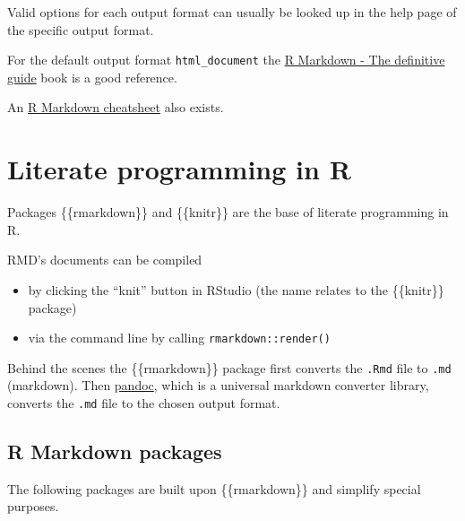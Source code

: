 \documentclass[]{book}
\begin{document}
Valid options for each output format can usually be looked up in the help page of the specific output format.

For the default output format \texttt{html\_document} the \href{https://bookdown.org/yihui/rmarkdown/html-document.html}{R Markdown - The definitive guide} book is a good reference.

An \href{https://rstudio.com/wp-content/uploads/2016/03/rmarkdown-cheatsheet-2.0.pdf}{R Markdown cheatsheet} also exists.

\hypertarget{literate-programming-in-r}{%
\section{Literate programming in R}\label{literate-programming-in-r}}

Packages \{\{rmarkdown\}\} and \{\{knitr\}\} are the base of literate programming in R.

RMD's documents can be compiled

\begin{itemize}
\item
  by clicking the ``knit'' button in RStudio (the name relates to the \{\{knitr\}\} package)
\item
  via the command line by calling \texttt{rmarkdown::render()}
\end{itemize}

Behind the scenes the \{\{rmarkdown\}\} package first converts the \texttt{.Rmd} file to \texttt{.md} (markdown).
Then \href{https://pandoc.org/}{pandoc}, which is a universal markdown converter library, converts the \texttt{.md} file to the chosen output format.

\hypertarget{r-markdown-packages}{%
\subsection{R Markdown packages}\label{r-markdown-packages}}

The following packages are built upon \{\{rmarkdown\}\} and simplify special purposes.
\end{document}

